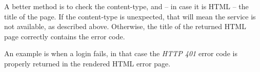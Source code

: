 A better method is to check the content-type, and -- in case it is HTML -- the
title of the page.  If the content-type is unexpected, that will mean the
service is not available, as described above. Otherwise, the title of the
returned HTML page correctly contains the error code.

An example is when a login fails, in that case the \emph{HTTP 401} error code
is properly returned in the rendered HTML error page.
